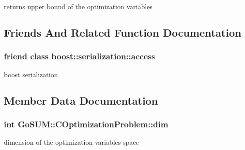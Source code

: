 returns upper bound of the optimization variables 



\subsection{Friends And Related Function Documentation}
\hypertarget{class_go_s_u_m_1_1_c_optimization_problem_ac98d07dd8f7b70e16ccb9a01abf56b9c}{
\subsubsection[{boost\-::serialization\-::access}]{\setlength{\rightskip}{0pt plus 5cm}friend class boost\-::serialization\-::access\hspace{0.3cm}{\ttfamily [friend]}}}\label{class_go_s_u_m_1_1_c_optimization_problem_ac98d07dd8f7b70e16ccb9a01abf56b9c}


boost serialization 



\subsection{Member Data Documentation}
\hypertarget{class_go_s_u_m_1_1_c_optimization_problem_aa70d039a76ff7035c4a3ee2fd74ffbd8}{
\subsubsection[{dim}]{\setlength{\rightskip}{0pt plus 5cm}int Go\-S\-U\-M\-::\-C\-Optimization\-Problem\-::dim\hspace{0.3cm}{\ttfamily [protected]}}}\label{class_go_s_u_m_1_1_c_optimization_problem_aa70d039a76ff7035c4a3ee2fd74ffbd8}


dimension of the optimization variables space 

